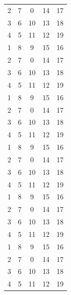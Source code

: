 \documentclass[12pt]{report} %
\begin{document}
\begin{longtable}{|c|ccc|c|}
2&  7&  0&  14& 17\\
3&  6&  10&  13& 18\\
4&  5&  11&  12& 19\\
1&  8&  9&  15& 16\\
2&  7&  0&  14& 17\\
3&  6&  10&  13& 18\\
4&  5&  11&  12& 19\\
1&  8&  9&  15& 16\\
2&  7&  0&  14& 17\\
3&  6&  10&  13& 18\\
4&  5&  11&  12& 19\\
1&  8&  9&  15& 16\\
2&  7&  0&  14& 17\\
3&  6&  10&  13& 18\\
4&  5&  11&  12& 19\\
1&  8&  9&  15& 16\\
2&  7&  0&  14& 17\\
3&  6&  10&  13& 18\\
4&  5&  11&  12& 19\\
1&  8&  9&  15& 16\\
2&  7&  0&  14& 17\\
3&  6&  10&  13& 18\\
4&  5&  11&  12& 19\\
\end{longtable}
\end{document}
